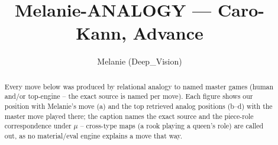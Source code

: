 \documentclass[11pt]{article}
\title{Melanie-ANALOGY — Caro-Kann, Advance}
\author{Melanie (Deep\_Vision)}
\date{}
\begin{document}
\maketitle

\begin{abstract}Every move below was produced by relational analogy to named master games (human and/or top-engine -- the exact source is named per move). Each figure shows our position with Melanie's move (a) and the top retrieved analog positions (b--d) with the master move played there; the caption names the exact source and the piece-role correspondence under $\mu$ -- cross-type maps (a rook playing a queen's role) are called out, as no material/eval engine explains a move that way.\end{abstract}

\begin{figure}[p]\centering
\begin{subfigure}{0.46\textwidth}\centering
\resizebox{\linewidth}{!}{%
\newchessgame
\chessboard[
  setfen={rn2kbnr/pp3ppp/1q2p3/2ppPb2/3P4/4BN2/PPP1BPPP/RN1QK2R w KQkq - 2 7},
  showmover=false,
  pgfstyle=straightmove, color=movearrow, markmove={b1-a3}
]}
\caption{}
\end{subfigure}\hfill
\begin{subfigure}{0.46\textwidth}\centering
\resizebox{\linewidth}{!}{%
\newchessgame
\chessboard[
  setfen={r1b1kbnr/pp3ppp/1qn1p3/2ppP3/3P4/2P2N2/PP3PPP/RNBQKB1R w KQkq - 3 6},
  showmover=false,
  pgfstyle=straightmove, color=movearrow, markmove={a2-a3}
]}
\caption{}
\end{subfigure}
\\[4pt]
\begin{subfigure}{0.46\textwidth}\centering
\resizebox{\linewidth}{!}{%
\newchessgame
\chessboard[
  setfen={r1b1kbnr/pp3ppp/1qn1p3/2ppP3/3P4/2P2N2/PP3PPP/RNBQKB1R w KQkq - 3 6},
  showmover=false,
  pgfstyle=straightmove, color=movearrow, markmove={a2-a3}
]}
\caption{}
\end{subfigure}\hfill
\begin{subfigure}{0.46\textwidth}\centering
\resizebox{\linewidth}{!}{%
\newchessgame
\chessboard[
  setfen={r1b1kbnr/pp3ppp/1qn1p3/2ppP3/3P4/2P2N2/PP3PPP/RNBQKB1R w KQkq - 3 6},
  showmover=false,
  pgfstyle=straightmove, color=movearrow, markmove={a2-a3}
]}
\caption{}
\end{subfigure}

\end{figure}
\end{document}
